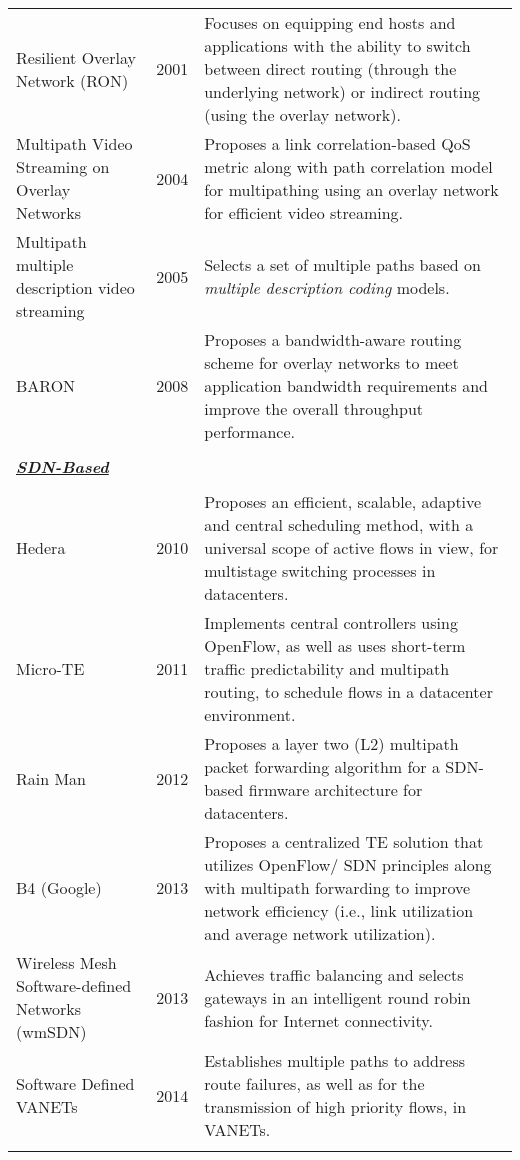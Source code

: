 \documentclass[10pt]{IEEEtran}
\begin{document}
\begin{table*}[!ht]
\begin{tabular}{p{5.5cm}p{1cm}p{10cm}}
Resilient Overlay Network (RON) \cite{andersen2001case} & 2001 & Focuses on equipping end hosts and applications with the ability to switch between direct routing (through the underlying network) or indirect routing (using the overlay network). \\
Multipath Video Streaming on Overlay Networks \cite{ma2004new} & 2004 & Proposes a link correlation-based QoS metric along with path correlation model for multipathing using an overlay network for efficient video streaming.\\
Multipath multiple description video streaming \cite{begen2005multi} & 2005	&  Selects a set of multiple paths based on \textit{multiple description coding} models.\\
BARON \cite{lee2008bandwidth} & 2008 & Proposes a bandwidth-aware routing scheme for overlay networks to meet application bandwidth requirements and improve the overall throughput performance.\\

\\

\multicolumn{2}{l}{\textbf{\underline{\emph{SDN-Based}}}}\\
\\

Hedera \cite{al2010hedera} & 2010 & Proposes an efficient, scalable, adaptive and central scheduling method, with a universal scope of active flows in view, for multistage switching processes in datacenters.\\
Micro-TE \cite{benson2011microte} & 2011 & Implements central controllers using OpenFlow, as well as uses short-term traffic predictability and multipath routing, to schedule flows in a datacenter environment. \\
Rain Man \cite{stephens2012designing} & 2012 & Proposes a layer two (L2) multipath packet forwarding algorithm for a SDN-based firmware architecture for datacenters.\\
B4 (Google) \cite{jain2013b4} & 2013 & Proposes a centralized TE solution that utilizes OpenFlow/ SDN principles along with multipath forwarding to improve network efficiency (i.e., link utilization and average network utilization). \\
Wireless Mesh Software-defined Networks (wmSDN) \cite{detti2013wireless} & 2013 & Achieves traffic balancing and selects gateways in an intelligent round robin fashion for Internet connectivity. \\
Software Defined VANETs \cite{kutowards} & 2014 & Establishes multiple paths to address route failures, as well as for the transmission of high priority flows, in VANETs. \\

\\
\hline
\end{tabular}
\end{table*}
\end{document}
